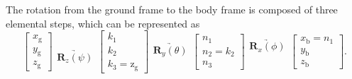 The rotation from the ground frame to the body frame is composed of
three elemental steps, which can be represented as
\begin{equation}
\left[{\begin{array}{c}
	{x_{\text{g}}}\\
	{y_{\text{g}}}\\
	{z_{\text{g}}}
	\end{array}}\right]\begin{array}{c}
\\
\\
\underrightarrow{{\mathbf{R}_{z}}\left(\psi\right)}
\end{array}\left[\begin{array}{c}
{k_{1}}\\
{k_{2}}\\
{k_{3}}={\text{z}_{\text{g}}}
\end{array}\right]\begin{array}{c}
\\
\underrightarrow{{\mathbf{R}_{y}}\left(\theta\right)}\\
\\
\end{array}\left[{\begin{array}{c}
	{n_{1}}\\
	{{n_{2}}={k_{2}}}\\
	{n_{3}}
	\end{array}}\right]\begin{array}{c}
\underrightarrow{{\mathbf{R}_{x}}\left(\phi\right)}\\
\\
\\
\end{array}\left[\begin{array}{c}
{x_{\text{b}}}={n_{1}}\\
{y_{\text{b}}}\\
{z_{\text{b}}}
\end{array}\right].\label{eq:asd}
\end{equation}

